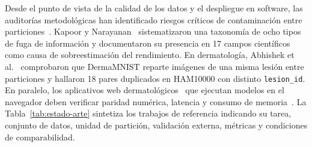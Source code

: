 Desde el punto de vista de la calidad de los datos y el despliegue en software, las auditorías metodológicas han identificado riesgos críticos de contaminación entre particiones~\cite{kapoor2023leakage,abhishek2025quality}. Kapoor y Narayanan~\cite{kapoor2023leakage} sistematizaron una taxonomía de ocho tipos de fuga de información y documentaron su presencia en 17 campos científicos como causa de sobreestimación del rendimiento. En dermatología, Abhishek et al.~\cite{abhishek2025quality} comprobaron que DermaMNIST reparte imágenes de una misma lesión entre particiones y hallaron 18 pares duplicados en HAM10000 con distinto \texttt{lesion\_id}. En paralelo, los aplicativos web dermatológicos~\cite{farias2026} que ejecutan modelos en el navegador deben verificar paridad numérica, latencia y consumo de memoria~\cite{ning2024onnxweb,wang2025browser}. La Tabla~\ref{tab:estado-arte} sintetiza los trabajos de referencia indicando su tarea, conjunto de datos, unidad de partición, validación externa, métricas y condiciones de comparabilidad.

